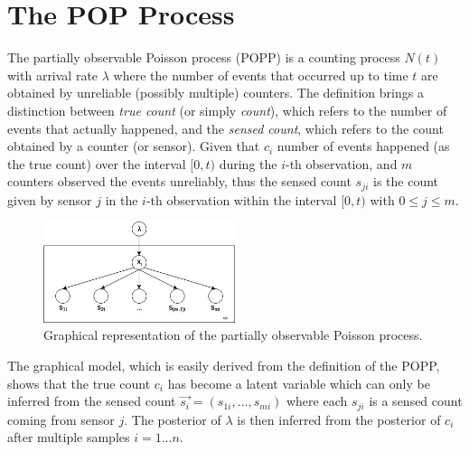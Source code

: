 \section{The POP Process}
\label{sec:popp}

The partially observable Poisson process (POPP) is a counting process $N(t)$ with arrival rate $\lambda$ where the number of events that occurred up to time $t$ are obtained by unreliable (possibly multiple) counters. The definition brings a distinction between \emph{true count} (or simply \emph{count}), which refers to the number of events that actually happened, and the \emph{sensed count}, which refers to the count obtained by a counter (or sensor). Given that $c_i$ number of events happened (as the true count) over the interval $[0, t)$ during the $i$-th observation, and $m$ counters observed the events unreliably, thus the sensed count $s_{ji}$ is the count given by sensor $j$ in the $i$-th observation within the interval $[0, t)$ with $0 \leq j \leq m$. 

\begin{figure}[t!]
	\centering
	\includegraphics[width=0.5\textwidth]{./figures/gm_popp.jpg}
    \caption{Graphical representation of the partially observable Poisson process.}
	\label{fig:gm_popp}
\end{figure}

The graphical model, which is easily derived from the definition of the POPP, shows that the true count $c_i$ has become a latent variable which can only be inferred from the sensed count $\overrightarrow{s_i} = (s_{1i}, \ldots, s_{mi})$ where each $s_{ji}$ is a sensed count coming from sensor $j$. The posterior of $\lambda$ is then inferred from the posterior of $c_i$ after multiple samples $i = 1 \ldots n$.

